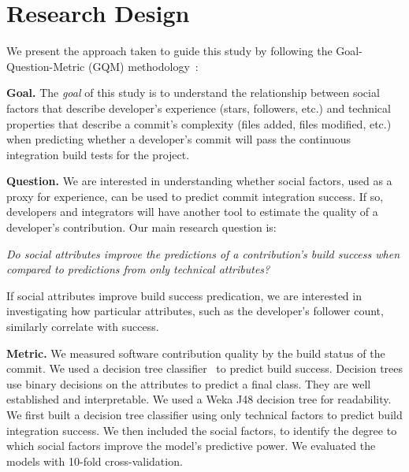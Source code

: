 \documentclass[10pt, conference]{IEEEtran}
\begin{document}
\section{Research Design}

We present the approach taken to guide this study by
following the Goal-Question-Metric (GQM) methodology~\cite{Basili84}:

\vspace{1ex}
\noindent\textbf{Goal.}
The \emph{goal} of this study is to understand the relationship 
between social factors that describe 
developer's experience (stars, followers, etc.) and technical properties that
describe a commit's complexity
(files added, files modified, etc.)
when predicting whether a developer's commit
will pass the continuous integration build tests for the project.

\vspace{1ex}
\noindent\textbf{Question.}
We are interested in understanding whether
social factors, used as a proxy for experience, can be used to predict
commit integration success. If so, 
developers and integrators will have another tool to estimate the quality
of a developer's contribution.
%
Our main research question is:

\vspace{1ex}
\noindent \emph{Do social attributes
improve the predictions of a contribution's build success when compared to
predictions from only technical attributes?}

If social attributes improve build success predication, we are
interested in investigating how particular attributes, such as the developer's
follower count, similarly correlate with success.

\vspace{1ex}
\noindent\textbf{Metric.} We measured software contribution quality by the
build status of the
commit. We used a decision tree classifier~\cite{Quinlan86} to predict build 
success. Decision trees 
use binary decisions on the
attributes to predict a final class. They are well
established and interpretable. We used a Weka J48 decision tree for readability.
We first built a
decision tree classifier using only technical factors to 
predict build integration
success.  We then included the social factors, to 
identify the degree to which social factors improve the model's predictive
power.
We evaluated the models with 10-fold cross-validation. 
\end{document}
